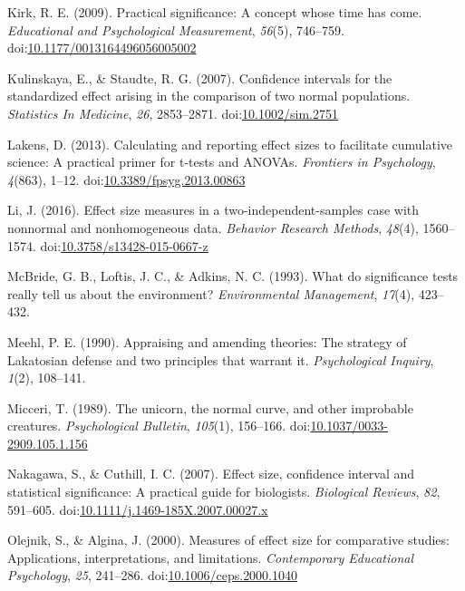 \documentclass[
  man,floatsintext]{apa6}
\begin{document}
\leavevmode\hypertarget{ref-Kirk_2009}{}%
Kirk, R. E. (2009). Practical significance: A concept whose time has come. \emph{Educational and Psychological Measurement}, \emph{56}(5), 746--759. doi:\href{https://doi.org/10.1177/0013164496056005002\%20}{10.1177/0013164496056005002 }

\leavevmode\hypertarget{ref-Kulinskaya_Staudte_2007}{}%
Kulinskaya, E., \& Staudte, R. G. (2007). Confidence intervals for the standardized effect arising in the comparison of two normal populations. \emph{Statistics In Medicine}, \emph{26}, 2853--2871. doi:\href{https://doi.org/10.1002/sim.2751}{10.1002/sim.2751}

\leavevmode\hypertarget{ref-Lakens_2013}{}%
Lakens, D. (2013). Calculating and reporting effect sizes to facilitate cumulative science: A practical primer for t-tests and ANOVAs. \emph{Frontiers in Psychology}, \emph{4}(863), 1--12. doi:\href{https://doi.org/10.3389/fpsyg.2013.00863}{10.3389/fpsyg.2013.00863}

\leavevmode\hypertarget{ref-Li_2016}{}%
Li, J. (2016). Effect size measures in a two-independent-samples case with nonnormal and nonhomogeneous data. \emph{Behavior Research Methods}, \emph{48}(4), 1560--1574. doi:\href{https://doi.org/10.3758/s13428-015-0667-z}{10.3758/s13428-015-0667-z}

\leavevmode\hypertarget{ref-McBride_et_al_1993}{}%
McBride, G. B., Loftis, J. C., \& Adkins, N. C. (1993). What do significance tests really tell us about the environment? \emph{Environmental Management}, \emph{17}(4), 423--432.

\leavevmode\hypertarget{ref-Meehl_1990}{}%
Meehl, P. E. (1990). Appraising and amending theories: The strategy of Lakatosian defense and two principles that warrant it. \emph{Psychological Inquiry}, \emph{1}(2), 108--141.

\leavevmode\hypertarget{ref-Micceri_1989}{}%
Micceri, T. (1989). The unicorn, the normal curve, and other improbable creatures. \emph{Psychological Bulletin}, \emph{105}(1), 156--166. doi:\href{https://doi.org/10.1037/0033-2909.105.1.156}{10.1037/0033-2909.105.1.156}

\leavevmode\hypertarget{ref-Nakagawa_and_Cuthill_2007}{}%
Nakagawa, S., \& Cuthill, I. C. (2007). Effect size, confidence interval and statistical significance: A practical guide for biologists. \emph{Biological Reviews}, \emph{82}, 591--605. doi:\href{https://doi.org/10.1111/j.1469-185X.2007.00027.x}{10.1111/j.1469-185X.2007.00027.x}

\leavevmode\hypertarget{ref-Olejnik_Algina_2000}{}%
Olejnik, S., \& Algina, J. (2000). Measures of effect size for comparative studies: Applications, interpretations, and limitations. \emph{Contemporary Educational Psychology}, \emph{25}, 241--286. doi:\href{https://doi.org/10.1006/ceps.2000.1040}{10.1006/ceps.2000.1040}
\end{document}
